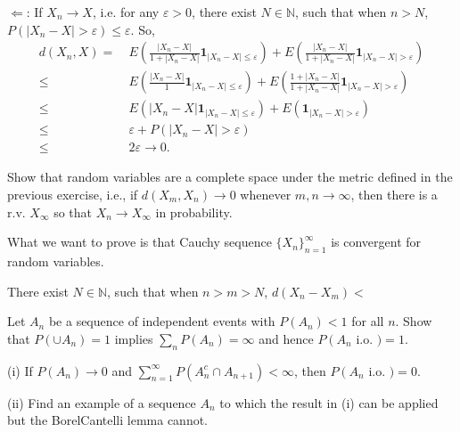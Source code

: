 \documentclass[en, normal, 11pt, black]{elegantnote}
\newenvironment{exercise}[1]{\begin{tcolorbox}[colback=black!15, colframe=black!80, breakable, title=#1]}{\end{tcolorbox}}
\newenvironment{solution}{\begin{tcolorbox}[colback=white, colframe=black!50, breakable, title=Solution. ]\setlength{\parskip}{0.8em}}{\end{tcolorbox}}
\begin{document}
\begin{solution}
        $\Longleftarrow$: If $X_n\to X$, i.e. for any $\varepsilon>0$, there exist $N\in\mathbb{N}$, such that when $n>N$, $P\left(|X_n-X|>\varepsilon\right)\leqslant\varepsilon$. So, 
        \[
            \begin{aligned}
                d(X_n, X)=&\ E\left(\frac{|X_n-X|}{1+|X_n-X|}\mathbf{1}_{|X_n-X|\leqslant\varepsilon}\right)+E\left(\frac{|X_n-X|}{1+|X_n-X|}\mathbf{1}_{|X_n-X|>\varepsilon}\right)\\
                \leqslant&\ E\left(\frac{|X_n-X|}{1}\mathbf{1}_{|X_n-X|\leqslant\varepsilon}\right)+E\left(\frac{1+|X_n-X|}{1+|X_n-X|}\mathbf{1}_{|X_n-X|>\varepsilon}\right)\\
                \leqslant&\ E(|X_n-X|\mathbf{1}_{|X_n-X|\leqslant\varepsilon})+E\left(\mathbf{1}_{|X_n-X|>\varepsilon}\right)\\
                \leqslant&\ \varepsilon+P(|X_n-X|>\varepsilon)\\
                \leqslant&\ 2\varepsilon\to0. 
            \end{aligned}
        \]
    \end{solution}

    \begin{exercise}{2.3.7}
        Show that random variables are a complete space under the metric defined in the previous exercise, i.e., if $d\left(X_{m}, X_{n}\right) \rightarrow 0$ whenever $m, n \rightarrow \infty$, then there is a r.v. $X_{\infty}$ so that $X_{n} \rightarrow X_{\infty}$ in probability. 
    \end{exercise}

    \begin{solution}
        What we want to prove is that Cauchy sequence $\{X_n\}_{n=1}^\infty$ is convergent for random variables. 

        There exist $N\in\mathbb{N}$, such that when $n>m>N$, $d(X_n-X_m)<$
    \end{solution}

    \begin{exercise}{2.3.8}
        Let $A_{n}$ be a sequence of independent events with $P\left(A_{n}\right)<1$ for all $n$. Show that $P\left(\cup A_{n}\right)=1$ implies $\sum_{n} P\left(A_{n}\right)=\infty$ and hence $P\left(A_{n}\right.$ i.o. $)=1$. 
    \end{exercise}

    \begin{exercise}{2.3.9}
        (i) If $P\left(A_{n}\right) \rightarrow 0$ and $\sum_{n=1}^{\infty} P\left(A_{n}^{c} \cap A_{n+1}\right)<\infty$, then $P\left(A_{n}\right.$ i.o. $)=0$. 
        
        (ii) Find an example of a sequence $A_{n}$ to which the result in (i) can be applied but the BorelCantelli lemma cannot. 
    \end{exercise}
    
\end{document}
